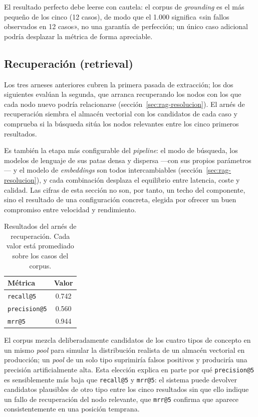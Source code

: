 El resultado perfecto debe leerse con cautela: el corpus de \textit{grounding} es el más pequeño
de los cinco (12 casos), de modo que el 1.000 significa «sin fallos observados en 12 casos», no una
garantía de perfección; un único caso adicional podría desplazar la métrica de forma apreciable.

\subsection{Recuperación (retrieval)}

Los tres arneses anteriores cubren la primera pasada de extracción; los dos siguientes evalúan la
segunda, que arranca recuperando los nodos con los que cada nodo nuevo podría relacionarse
(sección~\ref{sec:rag-resolucion}). El arnés de recuperación siembra el almacén vectorial con los
candidatos de cada caso y comprueba si la búsqueda sitúa los nodos relevantes entre los cinco
primeros resultados.

Es también la etapa más configurable del \textit{pipeline}: el modo de búsqueda, los modelos de
lenguaje de sus patas densa y dispersa —con sus propios parámetros— y el modelo de
\textit{embeddings} son todos intercambiables (sección~\ref{sec:rag-resolucion}), y cada
combinación desplaza el equilibrio entre latencia, coste y calidad. Las cifras de esta sección no
son, por tanto, un techo del componente, sino el resultado de una configuración concreta, elegida
por ofrecer un buen compromiso entre velocidad y rendimiento.

\begin{table}[H]
  \centering
  \begin{tabular}{lc}
    \toprule
    \textbf{Métrica} & \textbf{Valor} \\
    \midrule
    \texttt{recall@5}    & 0.742 \\
    \texttt{precision@5} & 0.560 \\
    \texttt{mrr@5}       & 0.944 \\
    \bottomrule
  \end{tabular}
  \caption{Resultados del arnés de recuperación. Cada valor está promediado sobre los casos del
           corpus.}
  \label{tab:eval-retrieval}
\end{table}

El corpus mezcla deliberadamente candidatos de los cuatro tipos de concepto en un mismo
\textit{pool} para simular la distribución realista de un almacén
vectorial en producción; un \textit{pool} de un solo tipo suprimiría falsos positivos y
produciría una precisión artificialmente alta. Esta elección explica en parte por qué
\texttt{precision@5} es sensiblemente más baja que \texttt{recall@5} y \texttt{mrr@5}: el
sistema puede devolver candidatos plausibles de otro tipo entre los cinco resultados sin que
ello indique un fallo de recuperación del nodo relevante, que \texttt{mrr@5} confirma que
aparece consistentemente en una posición temprana.

